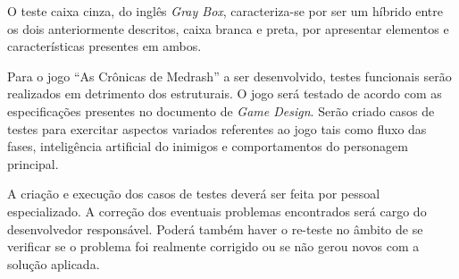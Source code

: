 O teste caixa cinza, do inglês \textit{Gray Box}, caracteriza-se por ser um
 híbrido entre os dois anteriormente descritos, caixa branca e preta, por
 apresentar elementos e características presentes em ambos.

Para o jogo ``As Crônicas de Medrash'' a ser desenvolvido, testes funcionais
 serão realizados em detrimento dos estruturais. O jogo será testado de
 acordo com as especificações presentes no documento de \textit{Game
 Design}. Serão criado casos de testes para exercitar aspectos variados
 referentes ao jogo tais como fluxo das fases, inteligência artificial do
 inimigos e comportamentos do personagem principal.
 
A criação e execução dos casos de testes deverá ser feita por pessoal
 especializado. A correção dos eventuais problemas encontrados será cargo do
 desenvolvedor responsável. Poderá também haver o re-teste no âmbito de se
 verificar se o problema foi realmente corrigido ou se não gerou novos com
 a solução aplicada.
